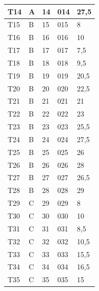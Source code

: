 \documentclass[	DIV=calc,%
paper=a4,%
fontsize=12pt,%
onecolumn]{scrartcl}	 					%
\begin{document}
\begin{table}[h]
\begin{tabular}{|l|l|l|l|l|}
			T14                 & A     & 14                & 014      & 27,5 \\ \hline
			T15                 & B     & 15                & 015      & 8            \\ \hline
			T16                 & B     & 16                & 016      & 10           \\ \hline
			T17                 & B     & 17                & 017      & 7,5 \\ \hline
			T18                 & B     & 18                & 018      & 9,5 \\ \hline
			T19                 & B     & 19                & 019      & 20,5 \\ \hline
			T20                 & B     & 20                & 020      & 22,5 \\ \hline
			T21                 & B     & 21                & 021      & 21   \\ \hline
			T22                 & B     & 22                & 022      & 23    \\ \hline
			T23                 & B     & 23                & 023      & 25,5 \\ \hline
			T24                 & B     & 24                & 024      & 27,5 \\ \hline
			T25                 & B     & 25                & 025      & 26   \\ \hline
			T26                 & B     & 26                & 026      & 28  \\ \hline
			T27                 & B     & 27                & 027      & 26,5 \\ \hline
			T28                 & B     & 28                & 028      & 29  \\ \hline
			T29                 & C     & 29                & 029      & 8   \\ \hline
			T30                 & C     & 30                & 030      & 10  \\ \hline
			T31                 & C     & 31                & 031      & 8,5 \\ \hline
			T32                 & C     & 32                & 032      & 10,5 \\ \hline
			T33                 & C     & 33                & 033      & 15,5 \\ \hline
			T34                 & C     & 34                & 034      & 16,5 \\ \hline
			T35                 & C     & 35                & 035      & 15   \\ \hline

\end{tabular}
\end{table}
\end{document}
